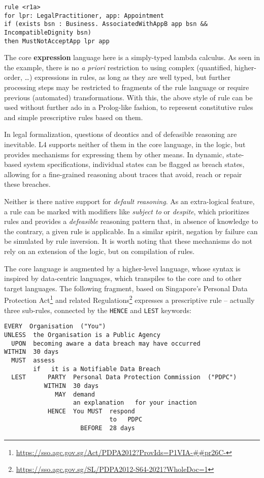 \documentclass[runningheads]{llncs}
\begin{document}
\begin{lstlisting}[language=L4]
rule <r1a>
for lpr: LegalPractitioner, app: Appointment
if (exists bsn : Business. AssociatedWithAppB app bsn && IncompatibleDignity bsn)
then MustNotAcceptApp lpr app
\end{lstlisting}

\noindent The core \textbf{expression} language here is a simply-typed lambda calculus. As seen in
the example, there is no \emph{a priori} restriction to using complex
(quantified, higher-order, \dots) expressions in rules, as long as they are
well typed, but further processing steps may be restricted to fragments of the
rule language or require previous (automated) transformations. With this, the
above style of rule can be used without further ado in a Prolog-like fashion, to represent constitutive rules and simple prescriptive rules based on them.

In legal formalization, questions of deontics and of defeasible reasoning are
inevitable. L4 supports neither of them in the core language, \ie{} in the logic, but
provides mechanisms for expressing them by other means. In dynamic, state-based system
specifications, individual states can be flagged as breach states,
allowing for a fine-grained reasoning about traces that avoid, reach or repair
these breaches.

Neither is there native support for \emph{default reasoning}. As an extra-logical feature, a rule can be marked with
modifiers like \emph{subject to} or \emph{despite}, which prioritizes rules and
provides a \emph{defeasible} reasoning pattern that, in absence
of knowledge to the contrary, a given rule is applicable. In a similar spirit,
negation by failure can be simulated by rule inversion. It is worth noting
that these mechanisms do not rely on an extension of the logic, but on
compilation of rules.

The core language is augmented by a higher-level language, whose syntax is inspired by data-centric languages, which transpiles to the core and to other target languages. The following fragment, based on Singapore's Personal Data Protection Act\footnote{\url{https://sso.agc.gov.sg/Act/PDPA2012?ProvIds=P1VIA-##pr26C-}} and related Regulations\footnote{\url{https://sso.agc.gov.sg/SL/PDPA2012-S64-2021?WholeDoc=1}} expresses a prescriptive rule -- actually three sub-rules, connected by the \texttt{HENCE} and \texttt{LEST} keywords:
\begin{lstlisting}[language=L4Sugary]
 EVERY  Organisation  ("You")
UNLESS  the Organisation is a Public Agency
  UPON  becoming aware a data breach may have occurred
WITHIN  30 days
  MUST  assess
        if   it is a Notifiable Data Breach
  LEST      PARTY  Personal Data Protection Commission  ("PDPC")
           WITHIN  30 days
              MAY  demand
                   an explanation   for your inaction
            HENCE  You MUST  respond
                             to   PDPC
                     BEFORE  28 days
\end{lstlisting}
\end{document}
